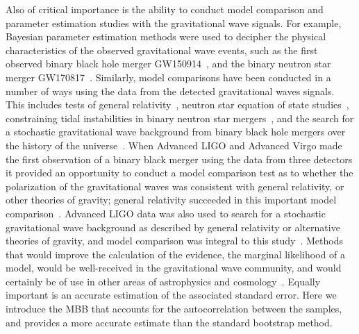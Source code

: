 \documentclass[aps,reprint,amsmath,amssymb,showpacs,showkeys]{revtex4-1}%
\newcommand{\jv}[1]{\textcolor{cyan}{JV: #1}}
\begin{document}
Also of critical importance is the ability to conduct model comparison and parameter estimation studies with the gravitational wave signals. For example, Bayesian parameter estimation methods were used to decipher the physical characteristics of the observed gravitational wave events, such as the first observed binary black hole merger GW150914~\cite{PhysRevLett.116.061102,PhysRevLett.116.241102,PhysRevX.6.041014}, and the binary neutron star merger GW170817~\cite{PhysRevLett.119.161101,Abbott:2018wiz}. Similarly, model comparisons have been conducted in a number of ways using the data from the detected gravitational waves signals. This includes tests of general relativity~\cite{PhysRevLett.116.221101}, neutron star equation of state studies~\cite{PhysRevLett.119.161101,Abbott:2018exr}, constraining tidal instabilities in binary neutron star mergers~\cite{Weinberg:2018icl}, and the search for a stochastic gravitational wave background from binary black hole mergers over the history of the universe~\cite{PhysRevX.8.021019}. When Advanced LIGO and Advanced Virgo made the first observation of a binary black merger using the data from three detectors it provided an opportunity to conduct a model comparison test as to whether the polarization of the gravitational waves was consistent with general relativity, or other theories of gravity; general relativity succeeded in this important model comparison~\cite{PhysRevLett.119.141101}. Advanced LIGO data was also used to search for a stochastic gravitational wave background as described by general relativity or alternative theories of gravity, and model comparison was integral to this study~\cite{PhysRevX.7.041058,PhysRevLett.120.201102}. Methods that would improve the calculation of the evidence, the marginal likelihood of a model, would be well-received in the gravitational wave community, and would certainly be of use in other areas of astrophysics and cosmology~\cite{doi:10.1146/annurev-astro-082214-122339}. Equally important is an accurate estimation of the associated standard error. Here we introduce the MBB that accounts for the autocorrelation between the samples, and provides a more accurate estimate than the standard bootstrap method.

\end{document}
